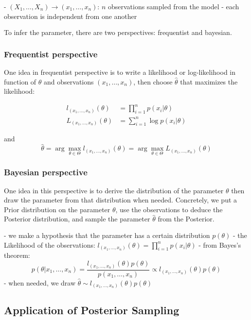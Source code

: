     - $(X_1,\dots,X_n)\rightarrow(x_1,\dots,x_n)$: $n$ observations sampled from the model
    - each observation is independent from one another
    
    To infer the parameter, there are two perspectives: frequentist and bayesian.
    
    \subsubsection{Frequentist perspective}
    \label{subsubsec:freq_perspective}
    
    One idea in frequentist perspective is to write a likelihood or log-likelihood in function of $\theta$ and observations $(x_1,\dots,x_n)$, then choose $\hat{\theta}$ that maximizes the likelihood:
    
    \begin{align*}
    l_{(x_1,\dots,x_n)}(\theta)&=\prod_{i=1}^{n}p(x_i|\theta) \\
    L_{(x_1,\dots,x_n)}(\theta)&=\sum_{i=1}^{n}\log p(x_i|\theta)
    \end{align*}
    
    and $$\hat{\theta}=\arg\max_{\theta\in\Theta}l_{(x_1,\dots,x_n)}(\theta)=\arg\max_{\theta\in\Theta}L_{(x_1,\dots,x_n)}(\theta)$$
    
    \subsubsection{Bayesian perspective}
    \label{subsubsec:bayes_perspective}
    
    One idea in this perspective is to derive the distribution of the parameter $\theta$ then draw the parameter from that distribution when needed. Concretely, we put a Prior distribution on the parameter $\theta$, use the observations to deduce the Posterior distribution, and sample the parameter $\hat{\theta}$ from the Posterior.
    
    - we make a hypothesis that the parameter has a certain distribution $p(\theta)$
    - the Likelihood of the observations: $l_{(x_1,\dots,x_n)}(\theta)=\prod_{i=1}^{n}p(x_i|\theta)$
    - from Bayes's theorem: $$p(\theta|x_1,\dots,x_n) =\frac{l_{(x_1,\dots,x_n)}(\theta)p(\theta)}{p(x_1,\dots,x_n)} \propto l_{(x_1,\dots,x_n)}(\theta)p(\theta)$$
    - when needed, we draw $\hat{\theta}\sim l_{(x_1,\dots,x_n)}(\theta)p(\theta)$
    
    \subsection{Application of Posterior Sampling}
    
